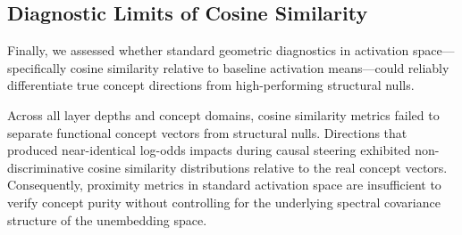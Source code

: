 \subsection{Diagnostic Limits of Cosine Similarity}
Finally, we assessed whether standard geometric diagnostics in activation space—specifically cosine similarity relative to baseline activation means—could reliably differentiate true concept directions from high-performing structural nulls.

Across all layer depths and concept domains, cosine similarity metrics failed to separate functional concept vectors from structural nulls. Directions that produced near-identical log-odds impacts during causal steering exhibited non-discriminative cosine similarity distributions relative to the real concept vectors. Consequently, proximity metrics in standard activation space are insufficient to verify concept purity without controlling for the underlying spectral covariance structure of the unembedding space.

